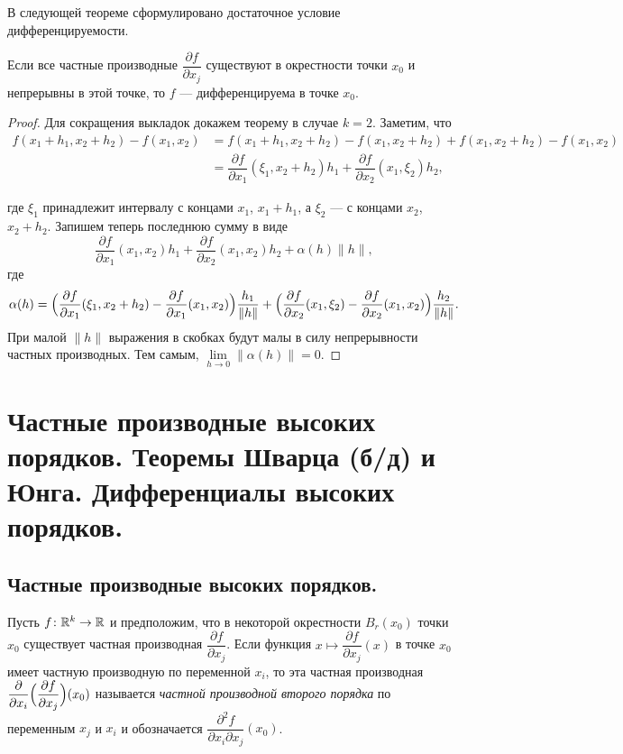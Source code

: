 \documentclass[a4paper]{article}
\theoremstyle{named}
\begin{document}
    В следующей теореме сформулировано достаточное условие дифференцируемости.

    \begin{theorem*}
        Если все частные производные $\dfrac{\partial f}{\partial x_j}$ существуют в окрестности точки $x_0$ и непрерывны в этой точке, то $f$ --- дифференцируема в точке $x_0$.
    \end{theorem*}

    \begin{proof}
        Для сокращения выкладок докажем теорему в случае $k=2$.
        Заметим, что
        \begin{align*}
            f(x_1+h_1,x_2+h_2) - f(x_1,x_2)
            &=f(x_1+h_1,x_2+h_2) - f(x_1,x_2+h_2) + f(x_1, x_2+h_2) - f(x_1,x_2) \\
            &=\dfrac{\partial f}{\partial x_1}(\xi_1, x_2+h_2)h_1 + \dfrac{\partial f}{\partial x_2}(x_1,\xi_2)h_2,
        \end{align*}

        где $\xi_1$ принадлежит интервалу с концами
        $x_1$, $x_1+h_1$, а $\xi_2$ --- с концами $x_2$, $x_2+h_2$.
        Запишем теперь последнюю сумму в виде
        $$
            \dfrac{\partial f}{\partial x_1}(x_1, x_2)h_1 + \dfrac{\partial f}{\partial x_2}(x_1,x_2)h_2 + \alpha(h)\|h\|,
        $$
        где
        $$
            \alpha(h) =
            \Bigl(\dfrac{\partial f}{\partial x_1}(\xi_1, x_2+h_2) - \dfrac{\partial f}{\partial x_1}(x_1, x_2)\Bigr)\dfrac{h_1}{\|h\|}
            +
            \Bigl(\dfrac{\partial f}{\partial x_2}(x_1,\xi_2) - \dfrac{\partial f}{\partial x_2}(x_1, x_2)\Bigr)\dfrac{h_2}{\|h\|}.
        $$
        При малой $\|h\|$ выражения в скобках будут малы в силу непрерывности частных производных.
        Тем самым, $\lim\limits_{h\to 0}\|\alpha(h)\| = 0$.
    \end{proof}

    \section{Частные производные высоких порядков. Теоремы Шварца (б/д) и Юнга. Дифференциалы высоких порядков.}

    \subsection{Частные производные высоких порядков.}

    \begin{definition*}
        Пусть $f\colon \mathbb{R}^k\to \mathbb{R}$ и предположим, что в некоторой окрестности $B_r(x_0)$ точки $x_0$ существует частная производная $\dfrac{\partial f}{\partial x_j}$. Если функция $x\mapsto \dfrac{\partial f}{\partial x_j}(x)$ в точке $x_0$ имеет частную производную по переменной $x_i$, то эта частная производная $\dfrac{\partial}{\partial x_i}\Bigl(\dfrac{\partial f}{\partial x_j}\Bigr) (x_0)$ называется {\it частной производной второго порядка} по переменным $x_j$ и $x_i$
        и обозначается $\dfrac{\partial^2 f}{\partial x_i\partial x_j}(x_0)$.
    \end{definition*}
\end{document}
